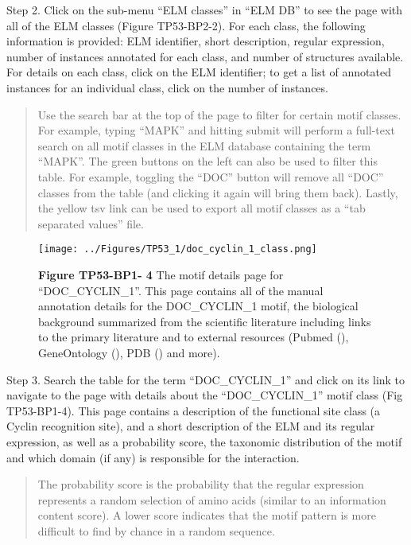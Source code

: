 Step 2. Click on the sub-menu ``ELM classes'' in ``ELM DB'' to see the
page with all of the ELM classes (Figure TP53-BP2-2). For each class,
the following information is provided: ELM identifier, short
description, regular expression, number of instances annotated for each
class, and number of structures available. For details on each class,
click on the ELM identifier; to get a list of annotated instances for an
individual class, click on the number of instances.

\begin{quote}
Use the search bar at the top of the page to filter for certain motif
classes. For example, typing ``MAPK'' and hitting submit will perform a
full-text search on all motif classes in the ELM database containing the
term ``MAPK''. The green buttons on the left can also be used to filter
this table. For example, toggling the ``DOC'' button will remove all
``DOC'' classes from the table (and clicking it again will bring them
back). Lastly, the yellow tsv link can be used to export all motif
classes as a ``tab separated values'' file.
\end{quote}

\begin{figure}[h!]
\centering
\texttt{[image: ../Figures/TP53\_1/doc\_cyclin\_1\_class.png]}
\caption{
\textbf{Figure TP53-BP1- 4} The motif details page for
``DOC\_CYCLIN\_1''. This page contains all of the manual annotation
details for the DOC\_CYCLIN\_1 motif, the biological background
summarized from the scientific literature including links to the primary
literature and to external resources (Pubmed (\cite{27899561}),
GeneOntology (\cite{27899567}), PDB (\cite{12037327}) and more).
}
\end{figure}

Step 3. Search the table for the term ``DOC\_CYCLIN\_1'' and click on
its link to navigate to the page with details about the
``DOC\_CYCLIN\_1'' motif class (Fig TP53-BP1-4). This page contains a
description of the functional site class (a Cyclin recognition site),
and a short description of the ELM and its regular expression, as well
as a probability score, the taxonomic distribution of the motif and
which domain (if any) is responsible for the interaction.

\begin{quote}
The probability score is the probability that the regular expression
represents a random selection of amino acids (similar to an information
content score). A lower score indicates that the motif pattern is more
difficult to find by chance in a random sequence.
\end{quote}

